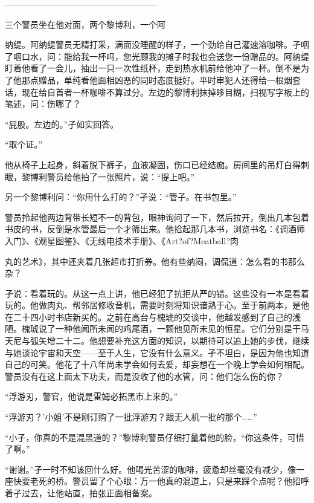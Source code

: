 \documentclass{article}
\begin{document}
——————————————————

三个警员坐在他对面，两个黎博利，一个阿

\newpage 

纳缇。阿纳缇警员无精打采，满面没睡醒的样子，一个劲给自己灌速溶咖啡。孑咽了咽口水，问：能给我一杯吗，您光顾我的摊子时我也会送您一份赠品的。阿纳缇盯着他看了一会儿，抽出一只一次性纸杯，走到热水机前给他冲了一杯。倒不是为了他那点赠品，单纯看他面相凶恶的同时态度挺好。平时审犯人还得给一根烟套话，现在给自首者一杯咖啡不算过分。左边的黎博利抹掉眵目糊，扫视写字板上的笔述，问：伤哪了？

“屁股。左边的。”孑如实回答。

“取个证。”

他从椅子上起身，斜着脱下裤子，血液凝固，伤口已经结痂。房间里的吊灯白得刺眼，黎博利警员给他拍了一张照片，说：“提上吧。”

另一个黎博利问：“你用什么打的？”孑说：“管子。在书包里。”

警员拎起他两边背带长短不一的背包，眼神询问了一下，然后拉开，倒出几本包着书皮的书，反倒是水管最后一个才筛出来。他拾起那几本书，浏览书名：《调酒师入门》、《观星图鉴》、《无线电技术手册》、《Art?of?Meatball?肉

\newpage 

丸的艺术》，其中还夹着几张超市打折券。他有些纳闷，调侃道：怎么看的书那么杂？

孑说：看着玩的。从这一点上讲，他已经犯了抗拒从严的错。这些没有一本是看着玩的。他做肉丸、帮邻居修收音机，需要时刻将知识谙熟于心。至于前两本，是他在二十四小时书店新买的。之前在高台与槐琥的交谈中，他越发感到了自己的浅陋。槐琥说了一种他闻所未闻的鸡尾酒，一颗他见所未见的恒星。它们分别是干马天尼与弧矢增二十二。他想要补充这方面的知识，以期待可以追上她的步伐，继续与她谈论宇宙和天空——至于人生，它没有什么意义。孑不坦白，是因为他也知道自己的可笑。他花了十八年尚未学会如何去爱，却妄想在一个晚上学会如何相配。警员没有在这上面太下功夫，而是没收了他的水管，问：他们怎么伤的你？

“浮游刃，警官，他说是雷姆必拓黑市上来的。”

“浮游刃？’小姐’不是刚订购了一批浮游刃？跟无人机一批的那个……”

“小子，你真的不是混黑道的？”黎博利警员仔细打量着他的脸，“你这条件，可惜了啊。”

\newpage 



“谢谢。”孑一时不知该回什么好。他喝光苦涩的咖啡，疲惫却丝毫没有减少，像一座快要老死的桥。警员留了个心眼：万一他真的混道上，只是来踩个点呢？他招呼着孑过去，让他站直，拍张正面相备案。
\end{document}
